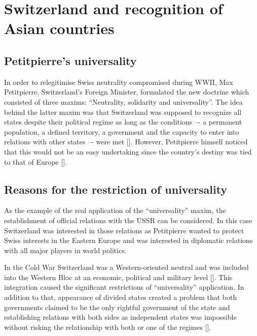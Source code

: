 \documentclass[a4paper]{article}
\begin{document}
\section{Switzerland and recognition of Asian countries}
\subsection{Petitpierre's universality}
In order to relegitimise Swiss neutrality compromised during WWII, Max Petitpierre, Switzerland’s Foreign Minister, formulated the new doctrine which consisted of three maxims: “Neutrality, solidarity and universality”. The idea behind the latter maxim was that Switzerland was supposed to recognize all states despite their political regime as long as the conditions –- a permanent population, a defined territory, a government and the capacity to enter into relations with other states –- were met []. However, Petitpierre himself noticed that this would not be an easy undertaking since the country’s destiny was tied to that of Europe []. 
\subsection{Reasons for the restriction of universality}
As the example of the real application of the “universality” maxim, the establishment of official relations with the USSR can be considered. In this case Switzerland was interested in those relations as Petitpierre wanted to protect Swiss interests in the Eastern Europe and was interested in diplomatic relations with all major players in world politics.

In the Cold War Switzerland was a Western-oriented neutral and was included into the Western Bloc at an economic, political and military level []. This integration caused the significant restrictions of “universality” application. In addition to that, appearance of divided states created a problem that both governments claimed to be the only rightful government of the state and establishing relations with both sides as independent states was impossible without risking the relationship with both or one of the regimes [].
\end{document}
